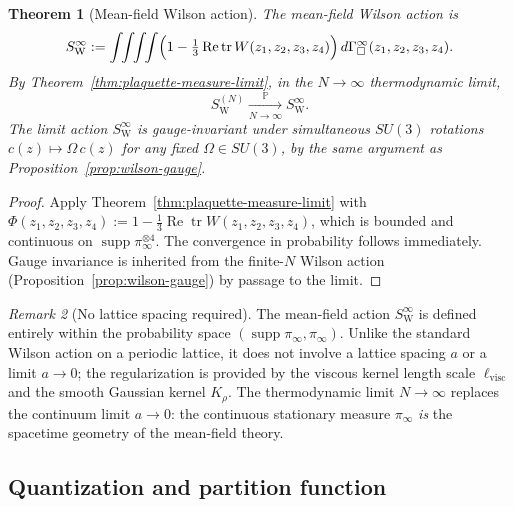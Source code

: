 \documentclass[11pt]{article}
\newtheorem{theorem}{Theorem}[section]
\theoremstyle{remark}
\newtheorem{remark}[theorem]{Remark}
\begin{document}
\begin{theorem}[Mean-field Wilson action]
\label{thm:mf-wilson}
The \emph{mean-field Wilson action} is
\[
S_{\mathrm W}^\infty
:=
\int\!\!\int\!\!\int\!\!\int
\Bigl(1-\tfrac13\operatorname{Re}\operatorname{tr}
W(z_1,z_2,z_3,z_4)\Bigr)
\,d\Gamma_\square^\infty(z_1,z_2,z_3,z_4).
\]
By Theorem~\ref{thm:plaquette-measure-limit}, in the $N\to\infty$ thermodynamic
limit,
\[
S_{\mathrm W}^{(N)}
\xrightarrow[N\to\infty]{\mathbb P}
S_{\mathrm W}^\infty.
\]
The limit action $S_{\mathrm W}^\infty$ is gauge-invariant under simultaneous
$SU(3)$ rotations $c(z)\mapsto\Omega\,c(z)$ for any fixed $\Omega\in SU(3)$,
by the same argument as Proposition~\ref{prop:wilson-gauge}.
\end{theorem}
\begin{proof}
Apply Theorem~\ref{thm:plaquette-measure-limit} with $\Phi(z_1,z_2,z_3,z_4)
:=1-\tfrac13\operatorname{Re}\operatorname{tr}W(z_1,z_2,z_3,z_4)$, which is
bounded and continuous on $\operatorname{supp}\pi_\infty^{\otimes 4}$.
The convergence in probability follows immediately.
Gauge invariance is inherited from the finite-$N$ Wilson action
(Proposition~\ref{prop:wilson-gauge}) by passage to the limit.
\end{proof}

\begin{remark}[No lattice spacing required]
\label{rem:no-lattice-spacing}
The mean-field action $S_{\mathrm W}^\infty$ is defined entirely within the
probability space $(\operatorname{supp}\pi_\infty, \pi_\infty)$.
Unlike the standard Wilson action on a periodic lattice, it does not involve a
lattice spacing $a$ or a limit $a\to0$; the regularization is provided by the
viscous kernel length scale $\ell_{\mathrm{visc}}$ and the smooth Gaussian
kernel $K_\rho$.
The thermodynamic limit $N\to\infty$ replaces the continuum limit $a\to0$: the
continuous stationary measure $\pi_\infty$ \emph{is} the spacetime geometry of
the mean-field theory.
\end{remark}

\subsection{Quantization and partition function}
\end{document}
